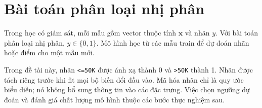\section{Bài toán phân loại nhị phân}
\label{sec:2_1}
Trong học có giám sát, mỗi mẫu gồm vector thuộc tính $\mathbf{x}$ và nhãn $y$. Với bài toán phân loại nhị phân, $y\in\{0,1\}$. Mô hình học từ các mẫu train để dự đoán nhãn hoặc điểm cho một mẫu mới.

Trong đề tài này, nhãn \texttt{<=50K} được ánh xạ thành 0 và \texttt{>50K} thành 1. Nhãn được tách riêng trước khi fit mọi bộ biến đổi đầu vào. Mã hóa nhãn chỉ là quy ước biểu diễn; nó không bổ sung thông tin vào các đặc trưng. Việc chọn ngưỡng dự đoán và đánh giá chất lượng mô hình thuộc các bước thực nghiệm sau.
